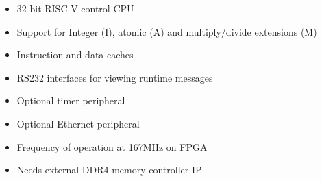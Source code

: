 \begin{itemize}
\item 32-bit RISC-V control CPU
\item Support for Integer (I), atomic (A) and multiply/divide extensions (M)
\item Instruction and data caches
\item RS232 interfaces for viewing runtime messages
\item Optional timer peripheral
\item Optional Ethernet peripheral
\item Frequency of operation at 167MHz on FPGA
\item Needs external DDR4 memory controller IP
\end{itemize}
